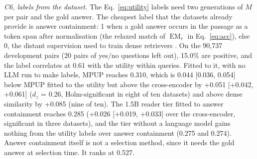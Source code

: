 \documentclass[preprint,12pt,authoryear]{elsarticle}
\begin{document}
\begin{table}[htbp]
    \centering
    \caption{Cost tiers of MPUP (C3), 1,641 rankable test questions, Qwen2.5-7B utility. Runs: the models run per query at selection time ($M$: the target LLM; R: a small reader; CE: the cross-encoder). $\Delta$: difference to the cross-encoder with its 95\% bootstrap interval. Time: mean selection time per query and peak GPU memory, measured one query at a time on 100 test questions (17.2 candidates on average, bfloat16, E5 and the cross-encoder included).}
    \label{tab:tiers}
    \footnotesize
\end{table}

\textit{C6, labels from the dataset.} The Eq.~\eqref{eq:utility} labels need two generations of $M$ per pair and the gold answer. The cheapest label that the datasets already provide is answer containment: 1 when a gold answer occurs in the passage as a token span after normalisation (the relaxed match of $\operatorname{EM}_r$ in Eq.~\eqref{eq:acc}), else 0, the distant supervision used to train dense retrievers \citep{karpukhin2020}. On the 90,737 development pairs (20 pairs of yes/no questions left out), 15.0\% are positive, and the label correlates at 0.61 with the utility within queries. Fitted to it, with no LLM run to make labels, MPUP reaches 0.310, which is 0.044 [0.036, 0.054] below MPUP fitted to the utility but above the cross-encoder by +0.051 [+0.042, +0.061] ($d_z$ = 0.26, Holm-significant in eight of ten datasets) and above dense similarity by +0.085 (nine of ten). The 1.5B reader tier fitted to answer containment reaches 0.285 (+0.026 [+0.019, +0.033] over the cross-encoder, significant in three datasets), and the tier without a language model gains nothing from the utility labels over answer containment (0.275 and 0.274). Answer containment itself is not a selection method, since it needs the gold answer at selection time. It ranks at 0.527.
\end{document}
